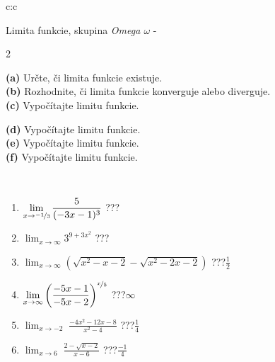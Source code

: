 \documentclass[10pt]{report}
\begin{document}
\newpage
\thispagestyle{empty}
\begin{tabular}{c:c}
\begin{minipage}[c][104.5mm][t]{0.5\linewidth}
\begin{center}
\vspace{7mm}
{\huge Limita funkcie, skupina \textit{Omega $\omega$} -}\\[5mm]
\begin{minipage}{0.95\linewidth}
\begin{center}
{\small \begin{multicols}{2} \raggedright
\textbf{(a)} Určte, či limita funkcie existuje. \\[1mm]
\textbf{(b)} Rozhodnite, či limita funkcie konverguje alebo diverguje. \\[1mm]
\textbf{(c)} Vypočítajte limitu funkcie. \par \columnbreak
\textbf{(d)} Vypočítajte limitu funkcie. \\[1mm]
\textbf{(e)} Vypočítajte limitu funkcie. \\[1mm]
\textbf{(f)} Vypočítajte limitu funkcie. \\[1mm]
\end{multicols}
}
\end{center}
\end{minipage}
\\[4mm]
\begin{minipage}{0.79\linewidth}
\begin{center}
\begin{varwidth}{\linewidth}
\begin{enumerate}
\normalsize
\item $\displaystyle\lim_{x\to\nicefrac{-1}{3}}{\frac{5}{(-3x-1)^{3}}}$\quad \dotfill\; ???\;\dotfill \quad {}
\item $\displaystyle\lim_{x\to\infty}{3^{9+3x^2}}$\quad \dotfill\; ???\;\dotfill \quad {}
\item $\displaystyle\lim_{x\to\infty}{\left(\sqrt{x^2-x-2} - \sqrt{x^2-2x-2}\right)}$\quad \dotfill\; ???\;\dotfill \quad $\frac{1}{2}$
\item $\displaystyle\lim_{x\to\infty}{\left( \frac{-5x-1}{-5x-2} \right)^{\nicefrac{x}{5}}}$\quad \dotfill\; ???\;\dotfill \quad $\infty$
\item $\displaystyle\lim_{x\to -2}{\;\frac{-4x^2-12x-8}{x^2-4}}$\quad \dotfill\; ???\;\dotfill \quad $\frac{1}{4}$
\item $\displaystyle\lim_{x\to 6}{\;\frac{2-\sqrt{x-2}}{x-6}}$\quad \dotfill\; ???\;\dotfill \quad $\frac{-1}{4}$

\end{enumerate}
\end{varwidth}
\end{center}
\end{minipage}
\end{center}
\end{minipage}
\end{tabular}
\end{document}
